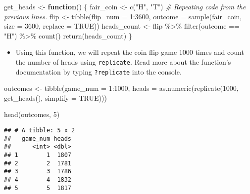 \documentclass[
]{book}
\newenvironment{Shaded}{\begin{snugshade}}{\end{snugshade}}
\newcommand{\AttributeTok}[1]{\textcolor[rgb]{0.77,0.63,0.00}{#1}}
\newcommand{\CommentTok}[1]{\textcolor[rgb]{0.56,0.35,0.01}{\textit{#1}}}
\newcommand{\ConstantTok}[1]{\textcolor[rgb]{0.00,0.00,0.00}{#1}}
\newcommand{\ControlFlowTok}[1]{\textcolor[rgb]{0.13,0.29,0.53}{\textbf{#1}}}
\newcommand{\DecValTok}[1]{\textcolor[rgb]{0.00,0.00,0.81}{#1}}
\newcommand{\FunctionTok}[1]{\textcolor[rgb]{0.00,0.00,0.00}{#1}}
\newcommand{\NormalTok}[1]{#1}
\newcommand{\OtherTok}[1]{\textcolor[rgb]{0.56,0.35,0.01}{#1}}
\newcommand{\SpecialCharTok}[1]{\textcolor[rgb]{0.00,0.00,0.00}{#1}}
\newcommand{\StringTok}[1]{\textcolor[rgb]{0.31,0.60,0.02}{#1}}
\providecommand{\tightlist}{%
  \setlength{\itemsep}{0pt}\setlength{\parskip}{0pt}}
\begin{document}
\begin{Shaded}
\begin{Highlighting}[]
\NormalTok{get\_heads }\OtherTok{\textless{}{-}} \ControlFlowTok{function}\NormalTok{() \{}
\NormalTok{  fair\_coin }\OtherTok{\textless{}{-}} \FunctionTok{c}\NormalTok{(}\StringTok{"H"}\NormalTok{, }\StringTok{"T"}\NormalTok{) }\CommentTok{\# Repeating code from the previous lines.}
\NormalTok{  flip }\OtherTok{\textless{}{-}} \FunctionTok{tibble}\NormalTok{(}\AttributeTok{flip\_num =} \DecValTok{1}\SpecialCharTok{:}\DecValTok{3600}\NormalTok{, }
                 \AttributeTok{outcome =} \FunctionTok{sample}\NormalTok{(fair\_coin, }\AttributeTok{size =} \DecValTok{3600}\NormalTok{, }\AttributeTok{replace =} \ConstantTok{TRUE}\NormalTok{))}
\NormalTok{  heads\_count }\OtherTok{\textless{}{-}}\NormalTok{ flip }\SpecialCharTok{\%\textgreater{}\%} \FunctionTok{filter}\NormalTok{(outcome }\SpecialCharTok{==} \StringTok{"H"}\NormalTok{) }\SpecialCharTok{\%\textgreater{}\%} \FunctionTok{count}\NormalTok{()}
  \FunctionTok{return}\NormalTok{(heads\_count)}
\NormalTok{\}}
\end{Highlighting}
\end{Shaded}

\begin{itemize}
\tightlist
\item
  Using this function, we will repeat the coin flip game 1000 times and count the number of heads using \texttt{replicate}. Read more about the function's documentation by typing \texttt{?replicate} into the console.
\end{itemize}

\begin{Shaded}
\begin{Highlighting}[]
\NormalTok{outcomes }\OtherTok{\textless{}{-}} \FunctionTok{tibble}\NormalTok{(}\AttributeTok{game\_num =} \DecValTok{1}\SpecialCharTok{:}\DecValTok{1000}\NormalTok{,}
                   \AttributeTok{heads =} \FunctionTok{as.numeric}\NormalTok{(}\FunctionTok{replicate}\NormalTok{(}\DecValTok{1000}\NormalTok{, }\FunctionTok{get\_heads}\NormalTok{(), }\AttributeTok{simplify =} \ConstantTok{TRUE}\NormalTok{))) }

\FunctionTok{head}\NormalTok{(outcomes, }\DecValTok{5}\NormalTok{)}
\end{Highlighting}
\end{Shaded}

\begin{verbatim}
## # A tibble: 5 x 2
##   game_num heads
##      <int> <dbl>
## 1        1  1807
## 2        2  1781
## 3        3  1786
## 4        4  1832
## 5        5  1817
\end{verbatim}
\end{document}
